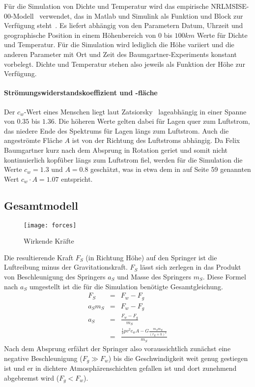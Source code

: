 Für die Simulation von Dichte und Temperatur wird das empirische NRLMSISE-00-Modell~\cite{nrlmsise00:goddardspaceflightcenter} verwendet, das in Matlab und Simulink als Funktion und Block zur Verfügung steht~\cite{matlab:mrlmsise-00}.
Es liefert abhängig von den Parametern Datum, Uhrzeit und geographische Position in einem Höhenbereich von $0$ bis $100km$ Werte für Dichte und Temperatur.
Für die Simulation wird lediglich die Höhe variiert und die anderen Parameter mit Ort und Zeit des Baumgartner-Experiments konstant vorbelegt.
Dichte und Temperatur stehen also jeweils als Funktion der Höhe zur Verfügung.

\paragraph{Strömungswiderstandskoeffizient und -fläche}
Der $c_w$-Wert eines Menschen liegt laut Zatsiorsky~\cite[88]{humankinetics} lageabhängig in einer Spanne von $0.35$ bis $1.36$.
Die höheren Werte gelten dabei für Lagen quer zum Luftstrom, das niedere Ende des Spektrums für Lagen längs zum Luftstrom.
Auch die angeströmte Fläche $A$ ist von der Richtung des Luftstroms abhängig.
Da Felix Baumgartner kurz nach dem Absprung in Rotation geriet und somit nicht kontinuierlich kopfüber längs zum Luftstrom fiel, werden für die Simulation die Werte $c_w=1.3$ und $A=0.8$ geschätzt, was in etwa dem in \cite{redbulletin:stratosspecialde} auf Seite 59 genannten Wert $c_w\cdot A=1.07$ entspricht.

\subsection{Gesamtmodell}

\begin{figure}[h]
  \centering
  \texttt{[image: forces]}
  \caption{Wirkende Kräfte}
  \label{fig:forces}
\end{figure}
Die resultierende Kraft $F_S$ (in Richtung Höhe) auf den Springer ist die Luftreibung minus der Gravitationskraft.
$F_S$ lässt sich zerlegen in das Produkt von Beschleunigung des Springers $a_S$ und Masse des Springers $m_S$.
Diese Formel nach $a_S$ umgestellt ist die für die Simulation benötigte Gesamtgleichung.
\begin{eqnarray}
  F_S &=& F_w-F_g \\
  a_Sm_S &=& F_w-F_g \nonumber \\
  a_S &=& \frac{F_w-F_g}{m_S} \label{f:a_s}\\
   &=& \frac{\frac{1}{2}pv^2c_wA-G\frac{m_Sm_E}{(r_E+h)^2}}{m_S} \nonumber
\end{eqnarray}
Nach dem Absprung erfährt der Springer also voraussichtlich zunächst eine negative Beschleunigung ($F_g\gg F_w$) bis die Geschwindigkeit weit genug gestiegen ist und er in dichtere Atmosphärenschichten gefallen ist und dort zunehmend abgebremst wird ($F_g<F_w$).


